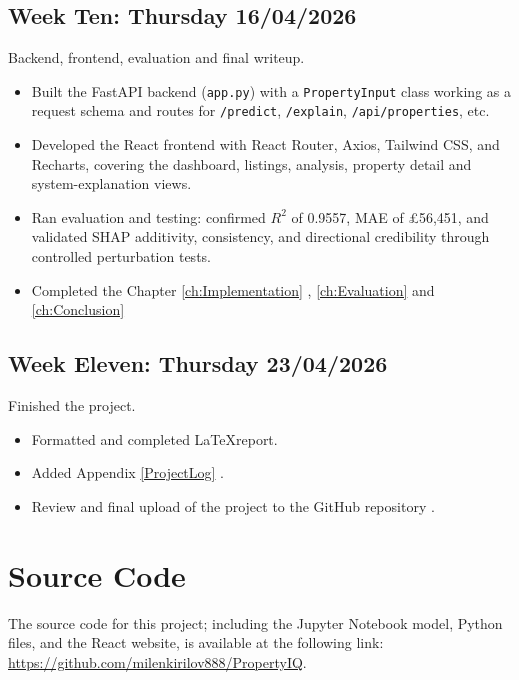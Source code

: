 \section*{Week Ten: Thursday 16/04/2026}
Backend, frontend, evaluation and final writeup.
\begin{itemize}
    \item Built the FastAPI backend (\verb|app.py|) with a \verb|PropertyInput| class working as a request schema and routes for \verb|/predict|, \verb|/explain|, \verb|/api/properties|, etc.
    \item Developed the React frontend with React Router, Axios, Tailwind CSS, and Recharts, covering the dashboard, listings, analysis, property detail and system-explanation views.
    \item Ran evaluation and testing: confirmed $R^{2}$ of 0.9557, MAE of \pounds56,451, and validated SHAP additivity, consistency, and directional credibility through controlled perturbation tests.
    \item Completed the Chapter \ref{ch:Implementation} , \ref{ch:Evaluation}  and \ref{ch:Conclusion} 
\end{itemize}

\section*{Week Eleven: Thursday 23/04/2026}
Finished the project.
\begin{itemize}
    \item Formatted and completed \LaTeX report.
    \item Added Appendix \ref{ProjectLog} .
    \item Review and final upload of the project to the GitHub repository \parencite{Kirilov2026}.
\end{itemize}

\chapter{Source Code}
\label{ch:SourceCode}

The source code for this project; including the Jupyter Notebook model, Python files, and the React website, is available at the following link: \url{https://github.com/milenkirilov888/PropertyIQ}.




